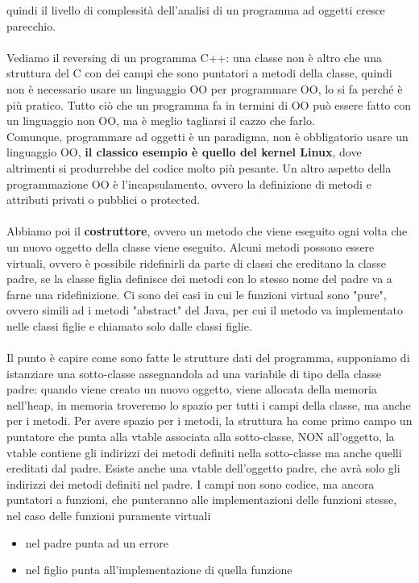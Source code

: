 \documentclass[12pt, oneside]{extbook}
\begin{document}
quindi il livello di complessità dell'analisi di un programma ad oggetti cresce parecchio.\\\\ Vediamo il reversing di un programma C++: una classe non è altro che una struttura del C con dei campi che sono puntatori a metodi della classe, quindi non è necessario usare un linguaggio OO per programmare OO, lo si fa perché è più pratico. Tutto ciò che un programma fa in termini di OO può essere fatto con un linguaggio non OO, ma è meglio tagliarsi il cazzo che farlo.\\ Comunque, programmare ad oggetti è un paradigma, non è obbligatorio usare un linguaggio OO, \textbf{il classico esempio è quello del kernel Linux}, dove altrimenti si produrrebbe del codice molto più pesante. Un altro aspetto della programmazione OO è l'incapsulamento, ovvero la definizione di metodi e attributi privati o pubblici o protected.\\\\ Abbiamo poi il \textbf{costruttore}, ovvero un metodo che viene eseguito ogni volta che un nuovo oggetto della classe viene eseguito. Alcuni metodi possono essere virtuali, ovvero è possibile ridefinirli da parte di classi che ereditano la classe padre, se la classe figlia definisce dei metodi con lo stesso nome del padre va a farne una ridefinizione. Ci sono dei casi in cui le funzioni virtual sono "pure", ovvero simili ad i metodi "abstract" del Java, per cui il metodo va implementato nelle classi figlie e chiamato solo dalle classi figlie.\\\\ Il punto è capire come sono fatte le strutture dati del programma, supponiamo di istanziare una sotto-classe assegnandola ad una variabile di tipo della classe padre: quando viene creato un nuovo oggetto, viene allocata della memoria nell'heap, in memoria troveremo lo spazio per tutti i campi della classe, ma anche per i metodi. Per avere spazio per i metodi, la struttura ha come primo campo un puntatore che punta alla vtable associata alla sotto-classe, NON all'oggetto, la vtable contiene gli indirizzi dei metodi definiti nella sotto-classe ma anche quelli ereditati dal padre. Esiste anche una vtable dell'oggetto padre, che avrà solo gli indirizzi dei metodi definiti nel padre. I campi non sono codice, ma ancora puntatori a funzioni, che punteranno alle implementazioni delle funzioni stesse, nel caso delle funzioni puramente virtuali
\begin{itemize}
\item nel padre punta ad un errore
\item nel figlio punta all'implementazione di quella funzione
\end{itemize}
\end{document}
